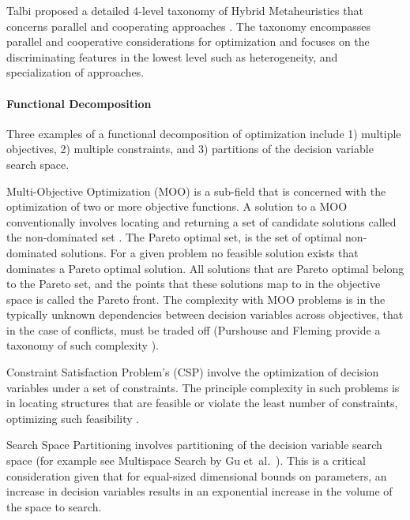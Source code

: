 Talbi proposed a detailed 4-level taxonomy of Hybrid Metaheuristics that concerns parallel and cooperating approaches \cite{Talbi2001}. The taxonomy encompasses parallel and cooperative considerations for optimization and focuses on the discriminating features in the lowest level such as heterogeneity, and specialization of approaches.
	
\paragraph{Functional Decomposition}
Three examples of a functional decomposition of optimization include 1) multiple objectives, 2) multiple constraints, and 3) partitions of the decision variable search space. 

Multi-Objective Optimization (MOO) is a sub-field that is concerned with the optimization of two or more objective functions. A solution to a MOO conventionally involves locating and returning a set of candidate solutions called the non-dominated set \cite{Deb2001}. The Pareto optimal set, is the set of optimal non-dominated solutions. For a given problem no feasible solution exists that dominates a Pareto optimal solution. All solutions that are Pareto optimal belong to the Pareto set, and the points that these solutions map to in the objective space is called the Pareto front. The complexity with MOO problems is in the typically unknown dependencies between decision variables across objectives, that in the case of conflicts, must be traded off (Purshouse and Fleming provide a taxonomy of such complexity \cite{Purshouse2003}). 

Constraint Satisfaction Problem's (CSP) involve the optimization of decision variables under a set of constraints. The principle complexity in such problems is in locating structures that are feasible or violate the least number of constraints, optimizing such feasibility \cite{Tsang1993, Kumar1992}. 

Search Space Partitioning involves partitioning of the decision variable search space (for example see Multispace Search by Gu et~al.\ \cite{Du1997, Gu1997, Gu1994}). This is a critical consideration given that for equal-sized dimensional bounds on parameters, an increase in decision variables results in an exponential increase in the volume of the space to search.
			

